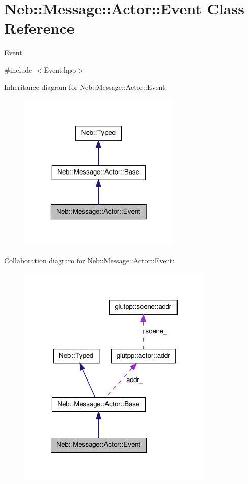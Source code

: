 \hypertarget{classNeb_1_1Message_1_1Actor_1_1Event}{\section{\-Neb\-:\-:\-Message\-:\-:\-Actor\-:\-:\-Event \-Class \-Reference}
\label{classNeb_1_1Message_1_1Actor_1_1Event}
}


\-Event  




{\ttfamily \#include $<$\-Event.\-hpp$>$}



\-Inheritance diagram for \-Neb\-:\-:\-Message\-:\-:\-Actor\-:\-:\-Event\-:\nopagebreak
\begin{figure}[H]
\begin{center}
\leavevmode
\includegraphics[width=220pt]{classNeb_1_1Message_1_1Actor_1_1Event__inherit__graph}
\end{center}
\end{figure}


\-Collaboration diagram for \-Neb\-:\-:\-Message\-:\-:\-Actor\-:\-:\-Event\-:\nopagebreak
\begin{figure}[H]
\begin{center}
\leavevmode
\includegraphics[width=266pt]{classNeb_1_1Message_1_1Actor_1_1Event__coll__graph}
\end{center}
\end{figure}
